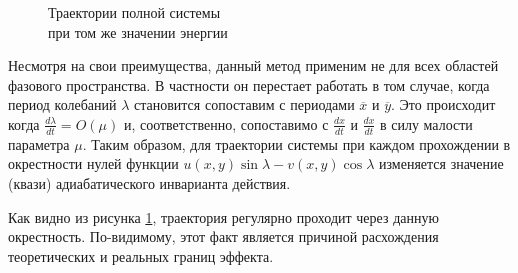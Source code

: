 \begin{figure}[!htb]
\begin{minipage}{0.5\textwidth}
        \caption{Траектории полной системы \\ при том же значении энергии}
        \label{real_fig}
    \end{minipage}
\end{figure}

Несмотря на свои преимущества, данный метод применим не для всех областей фазового пространства. В частности он перестает работать в том случае, когда период колебаний $\lambda$ становится сопоставим с периодами $\overline x$ и $\overline y$. Это происходит когда $\frac{d \lambda}{dt} = O(\mu)$ и, соответственно, сопоставимо с $\frac{dx}{dt}$ и $\frac{dx}{dt}$ в силу малости параметра $\mu$. Таким образом, для траектории системы при каждом прохождении в окрестности нулей функции $u(x,y)\sin \lambda - v(x,y) \cos \lambda$ изменяется значение (квази) адиабатического инварианта действия.

Как видно из рисунка \ref{real_fig}, траектория регулярно проходит через данную окрестность. По-видимому, этот факт является причиной расхождения теоретических и реальных границ эффекта.
